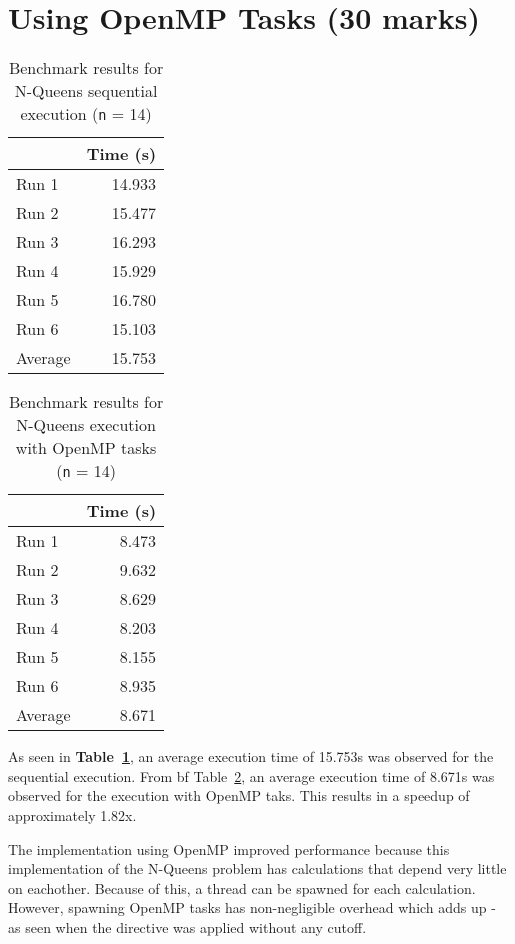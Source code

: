 \documentclass[12pt]{article}
\begin{document}

\section*{Using OpenMP Tasks (30 marks)}

\begin{table}[H]
  \centering
  \begin{tabular}{lr}
    & {\bf Time (s)} \\
    \hline
    Run 1 & 14.933 \\
    Run 2 & 15.477 \\
    Run 3 & 16.293 \\
    Run 4 & 15.929 \\
    Run 5 & 16.780 \\
    Run 6 & 15.103 \\
    \hline
    Average & 15.753 \\
  \end{tabular}
  \caption{Benchmark results for N-Queens sequential execution ({\tt n} = 14)}
  \label{tbl-nqueens-sequential}
\end{table}

\begin{table}[H]
  \centering
  \begin{tabular}{lr}
    & {\bf Time (s)} \\
    \hline
    Run 1 & 8.473 \\
    Run 2 & 9.632 \\
    Run 3 & 8.629 \\
    Run 4 & 8.203 \\
    Run 5 & 8.155 \\
    Run 6 & 8.935 \\
    \hline
    Average & 8.671 \\
  \end{tabular}
  \caption{Benchmark results for N-Queens execution with OpenMP tasks ({\tt n} = 14)}
  \label{tbl-nqueens-tasks}
\end{table}

As seen in {\bf Table~\ref{tbl-nqueens-sequential}}, an average execution time of 15.753s was observed for the sequential execution. From {bf Table~\ref{tbl-nqueens-tasks}}, an average execution time of 8.671s was observed for the execution with OpenMP taks. This results in a speedup of approximately 1.82x.

The implementation using OpenMP improved performance because this implementation of the N-Queens problem has calculations that depend very little on eachother. Because of this, a thread can be spawned for each calculation. However, spawning OpenMP tasks has non-negligible overhead which adds up - as seen when the directive was applied without any cutoff.
\end{document}
